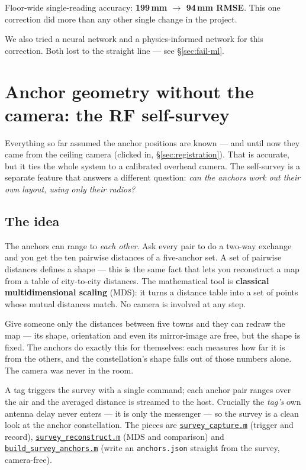 \documentclass[11pt,a4paper]{article}
\newcommand{\gh}[2]{\href{https://github.com/AdershM-2/UWB_3/blob/main/#1}{\texttt{#2}}}
\newcommand{\code}[1]{\texttt{#1}}
\begin{document}
\begin{result}
Floor-wide single-reading accuracy: \textbf{199\,mm $\to$ 94\,mm RMSE}. This one
correction did more than any other single change in the project.
\end{result}

We also tried a neural network and a physics-informed network for this correction.
Both lost to the straight line --- see \S\ref{sec:fail-ml}.

\section{Anchor geometry without the camera: the RF self-survey}
\label{sec:survey}

Everything so far assumed the anchor positions are known --- and until now they came
from the ceiling camera (clicked in, \S\ref{sec:registration}). That is accurate, but
it ties the whole system to a calibrated overhead camera. The self-survey is a
separate feature that answers a different question: \emph{can the anchors work out
their own layout, using only their radios?}

\subsection{The idea}

The anchors can range to \emph{each other}. Ask every pair to do a two-way exchange
and you get the ten pairwise distances of a five-anchor set. A set of pairwise
distances defines a shape --- this is the same fact that lets you reconstruct a map
from a table of city-to-city distances. The mathematical tool is \textbf{classical
multidimensional scaling} (MDS): it turns a distance table into a set of points whose
mutual distances match. No camera is involved at any step.

\begin{plainwords}
Give someone only the distances between five towns and they can redraw the map ---
its shape, orientation and even its mirror-image are free, but the shape is fixed.
The anchors do exactly this for themselves: each measures how far it is from the
others, and the constellation's shape falls out of those numbers alone. The camera
was never in the room.
\end{plainwords}

A tag triggers the survey with a single command; each anchor pair ranges over the air
and the averaged distance is streamed to the host. Crucially the \emph{tag's} own
antenna delay never enters --- it is only the messenger --- so the survey is a clean
look at the anchor constellation. The pieces are
\gh{matlab/scripts/survey\_capture.m}{survey\_capture.m} (trigger and record),
\gh{matlab/scripts/survey\_reconstruct.m}{survey\_reconstruct.m} (MDS and comparison)
and \gh{matlab/scripts/build\_survey\_anchors.m}{build\_survey\_anchors.m} (write an
\code{anchors.json} straight from the survey, camera-free).
\end{document}

